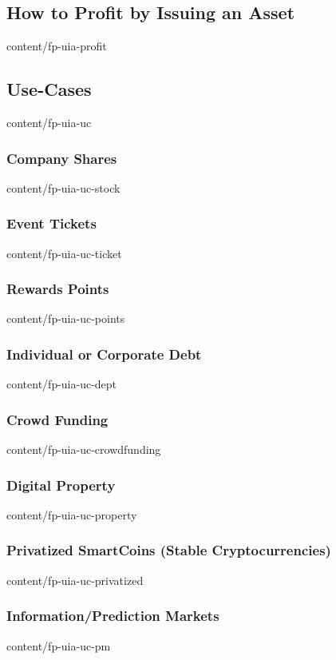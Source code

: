 \documentclass[conference,final,10pt,a4paper]{IEEEtran}
\begin{document}
\subsection    { How to Profit by Issuing an Asset               }  { content/fp-uia-profit          } 
\subsection    { Use-Cases                                       }  { content/fp-uia-uc              } 
\subsubsection { Company Shares                                  }  { content/fp-uia-uc-stock        } 
\subsubsection { Event Tickets                                   }  { content/fp-uia-uc-ticket       } 
\subsubsection { Rewards Points                                  }  { content/fp-uia-uc-points       } 
\subsubsection { Individual or Corporate Debt                    }  { content/fp-uia-uc-dept         } 
\subsubsection { Crowd Funding                                   }  { content/fp-uia-uc-crowdfunding } 
\subsubsection { Digital Property                                }  { content/fp-uia-uc-property     } 
\subsubsection { Privatized SmartCoins (Stable Cryptocurrencies) }  { content/fp-uia-uc-privatized   } 
\subsubsection { Information/Prediction Markets                  }  { content/fp-uia-uc-pm           } 
\end{document}
